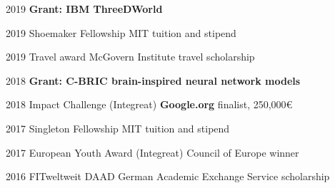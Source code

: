 {%


\block%
{%
2019  %
}{%
}{%
}{%
\textbf{Grant: IBM ThreeDWorld}
}{%
}{%
}

\award%
{%
2019
}{%
Shoemaker Fellowship  %
}{%
MIT
}{%
tuition and stipend
}

\award%
{%
2019
}{%
Travel award
}{%
McGovern Institute %
}{%
travel scholarship
}

\block%
{%
2018
}{%
}{%
}{%
\textbf{Grant: C-BRIC brain-inspired neural network models}
}{%
}{%
}

\award%
{%
2018
}{%
Impact Challenge (Integreat)
}{%
\textbf{Google.org}
}{%
finalist, 250,000\euro{}
}

\award%
{%
2017
}{%
Singleton Fellowship  %
}{%
MIT
}{%
tuition and stipend  %
}

\award%
{%
2017
}{%
European Youth Award (Integreat)
}{%
Council of Europe
}{%
winner
}


\award%
{%
2016
}{%
FITweltweit
}{%
DAAD German Academic Exchange Service
}{%
scholarship %
}

}
